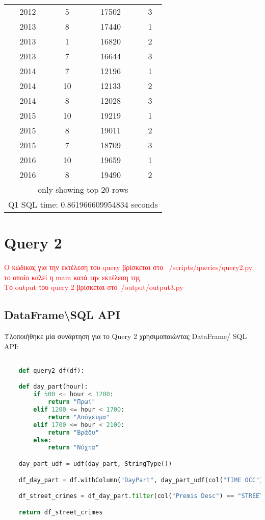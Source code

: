 \documentclass{article}
\begin{document}
\begin{center}
\begin{tabular}[t]{|c|c|c|c|}
2012 & 5 & 17502 & 3 \\
2013 & 8 & 17440 & 1 \\
2013 & 1 & 16820 & 2 \\
2013 & 7 & 16644 & 3 \\
2014 & 7 & 12196 & 1 \\
2014 & 10 & 12133 & 2 \\
2014 & 8 & 12028 & 3 \\
2015 & 10 & 19219 & 1 \\
2015 & 8 & 19011 & 2 \\
2015 & 7 & 18709 & 3 \\
2016 & 10 & 19659 & 1 \\
2016 & 8 & 19490 & 2 \\
\hline
\multicolumn{4}{|c|}{only showing top 20 rows} \\
\hline
\multicolumn{4}{|c|}{Q1 SQL time: 0.861966609954834 seconds} \\
\hline
\end{tabular}
\end{center}

\vspace{2\baselineskip}


\section{Query 2}
\textcolor{red}{Ο κώδικας για την εκτέλεση του query βρίσκεται στο  /scripts/queries/query2.py το οποίο καλεί η main κατά την εκτέλεση της} \\
\textcolor{red}{Το output του query 2 βρίσκεται στο /output/output3.py} \\

\subsection*{DataFrame\textbackslash SQL  API}

Υλοποιήθηκε μία συνάρτηση για το Query 2 χρησιμοποιώντας DataFrame/ SQL API:

\begin{lstlisting}[language = Python]

    def query2_df(df):

    def day_part(hour):
        if 500 <= hour < 1200:
            return "Πρωί"
        elif 1200 <= hour < 1700:
            return "Απόγευμα"
        elif 1700 <= hour < 2100:
            return "Βράδυ"
        else:
            return "Νύχτα"

    day_part_udf = udf(day_part, StringType())

    df_day_part = df.withColumn("DayPart", day_part_udf(col("TIME OCC")))

    df_street_crimes = df_day_part.filter(col("Premis Desc") == "STREET").groupBy("DayPart").count().orderBy(col("count").desc())

    return df_street_crimes
\end{lstlisting}
\end{document}
